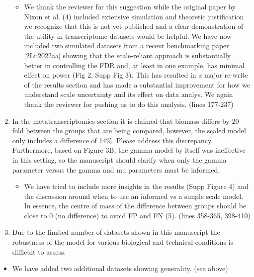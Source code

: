 \documentclass[
]{article}
\providecommand{\tightlist}{%
  \setlength{\itemsep}{0pt}\setlength{\parskip}{0pt}}
\begin{document}
\begin{enumerate}
  \begin{itemize}
  \tightlist
  \item
    We thank the reviewer for this suggestion while the original paper
    by Nixon et al. (4) included extensive simulation and theoretic
    justification we recognize that this is not yet published and a
    clear demonstration of the utility in transcriptome datasets would
    be helpful. We have now included two simulated datasets from a
    recent benchmarking paper {[}2Li:2022aa{]} showing that the
    scale-reliant approach is substantially better in controlling the
    FDR and, at least in one example, has minimal effect on power (Fig
    2, Supp Fig 3). This has resulted in a major re-write of the results
    section and has made a substantial improvement for how we understand
    scale uncertainty and its effect on data analys. We again thank the
    reviewer for pushing us to do this analysis. (lines 177-237)
  \end{itemize}
\item
  In the metatranscriptomics section it is claimed that biomass differs
  by 20 fold between the groups that are being compared, however, the
  scaled model only includes a difference of 14\%. Please address this
  discrepancy. Furthermore, based on Figure 3B, the gamma model by
  itself was ineffective in this setting, so the manuscript should
  clarify when only the gamma parameter versus the gamma and mu
  parameters must be informed.

  \begin{itemize}
  \tightlist
  \item
    We have tried to include more insights in the results (Supp Figure
    4) and the discussion around when to use an informed vs a simple
    scale model. In essence, the centre of mass of the difference
    between groups should be close to 0 (no difference) to avoid FP and
    FN (5). (lines 358-365, 398-410)
  \end{itemize}
\item
  Due to the limited number of datasets shown in this manuscript the
  robustness of the model for various biological and technical
  conditions is difficult to assess.
\end{enumerate}

\begin{itemize}
\tightlist
\item
  We have added two additional datasets showing generality. (see above)
\end{itemize}
\end{document}
